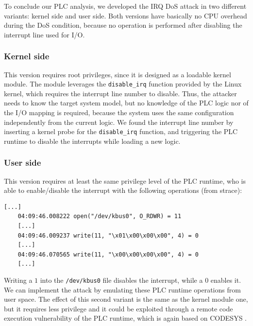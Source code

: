 To conclude our PLC analysis, we developed the IRQ DoS attack in two different variants: kernel side and user side.
Both versions have basically no CPU overhead during the DoS condition, because no operation is performed after disabling the interrupt line used for I/O.


\subsubsection{Kernel side}

This version requires root privileges, since it is designed as a loadable kernel module.
The module leverages the \verb|disable_irq| function provided by the Linux kernel, which requires the interrupt line number to disable.
Thus, the attacker needs to know the target system model, but no knowledge of the PLC logic nor of the I/O mapping is required, because the system uses the same
configuration independently from the current logic.
We found the interrupt line number by inserting a kernel probe for the \verb|disable_irq| function, and triggering the PLC runtime to disable the interrupts
while loading a new logic.


\subsubsection{User side}

This version requires at least the same privilege level of the PLC runtime, who is able to enable/disable the interrupt with the following operations (from strace):
\begin{Verbatim}[fontsize=\small]
	[...]
	04:09:46.008222 open("/dev/kbus0", O_RDWR) = 11
	[...]
	04:09:46.009237 write(11, "\x01\x00\x00\x00", 4) = 0
	[...]
	04:09:46.070565 write(11, "\x00\x00\x00\x00", 4) = 0
	[...]
\end{Verbatim}
Writing a $1$ into the \verb|/dev/kbus0| file disables the interrupt, while a $0$ enables it. We can implement the attack by emulating these PLC runtime operations from user space.
The effect of this second variant is the same as the kernel module one, but it requires less privilege and it could be exploited through a
remote code execution vulnerability of the PLC runtime, which is again based on CODESYS \cite{abb-codesys,codesys-server}.
